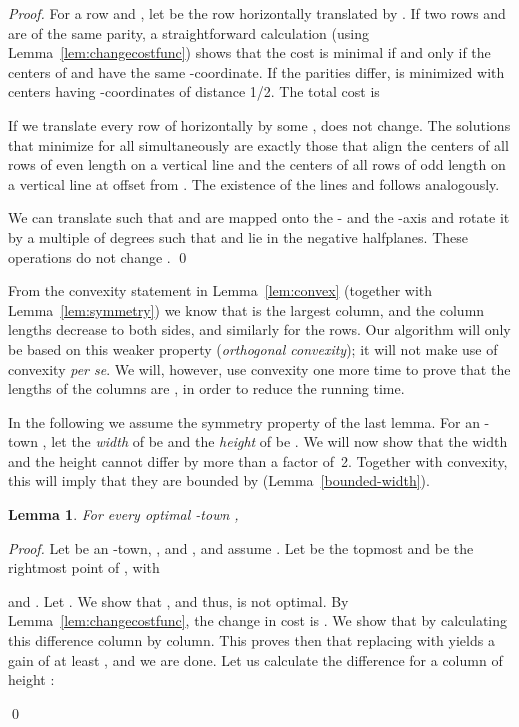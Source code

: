 \documentclass[preprint,authoryear,12pt]{elsarticle}
\newtheorem{lemma}[theorem]{Lemma}
\begin{document}
\begin{proof}
For a row  and , let  be
the row  horizontally translated by . If two rows  and 
are of the same parity, a straightforward calculation
(using Lemma~\ref{lem:changecostfunc}) shows that
the cost  is minimal if
and only if the centers of  and  have the same -coordinate. If the parities differ,  is
minimized with centers having -coordinates of distance 1/2.
The total cost is

If we translate every row  of  horizontally by some
,  does not change. The solutions that minimize
 for all 
simultaneously are exactly those that align the centers of all rows
of even length on a vertical line  and the centers of all rows
of odd length on a vertical line  at offset  from
. The existence of the lines  and  follows
analogously.


We can translate  such that  and  are mapped onto the
- and the -axis and rotate it by a multiple of 
degrees such that  and  lie in the negative halfplanes.
These operations do not change . \qed
\end{proof}


{From} the convexity statement in Lemma~\ref{lem:convex} (together
with Lemma~\ref{lem:symmetry}) we know that  is the largest
column, and the column lengths decrease to both sides, and similarly
for the rows.
Our algorithm will only be based on this weaker property
(\emph{orthogonal convexity}); it will not make use of convexity
\emph{per se}.
We will, however, use convexity one more time to prove that the
lengths of the columns are , in order to reduce the
running time.




In the following we assume the symmetry property of the last lemma.
For an -town , let the \emph{width} of  be
 and the \emph{height} of  be
. We will now show that the width
and the height cannot differ by more than a factor of~2.
Together with convexity, this will imply that they are bounded by
 (Lemma~\ref{bounded-width}).

\begin{lemma}
\label{relative-bound-width} For every optimal -town ,

\end{lemma}

\begin{proof}
Let  be an -town, , and , and assume
 .
 Let  be the
topmost and  be the rightmost point of ,
with

and
. Let .
We show that ,
and
thus,  is not optimal.
By Lemma~\ref{lem:changecostfunc},
 the change in cost is .
We show that  by
 calculating this difference column by column.
This proves then that replacing  with  yields a gain
of at least , and we are done.
Let us calculate the difference
  for a column  of height :

\qed
\end{proof}
\end{document}

